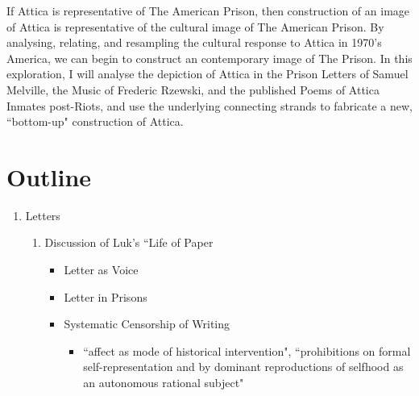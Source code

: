 \documentclass[14pt, letterpaper]{report}
\begin{document}
	If Attica is representative of The American Prison, then construction 
	of an image of Attica is representative of the cultural image of 
	The American Prison. By analysing, relating, and resampling the 
	cultural response to Attica in 1970's America, we can begin to 
	construct an contemporary image of The Prison. In this exploration, 
	I will analyse the depiction of Attica in the Prison Letters of 
	Samuel Melville, the Music of Frederic Rzewski, and the published 
	Poems of Attica Inmates post-Riots, and use the underlying connecting 
	strands to fabricate a new, ``bottom-up" construction of Attica. 
	
	\section*{Outline}
	
	\begin{enumerate}
	
		\item Letters
		\begin{enumerate}
		
			\item Discussion of Luk's ``Life of Paper
			\begin{itemize}
				
				\item Letter as Voice
				
				\item Letter in Prisons
				
				\item Systematic Censorship of Writing
				\begin{itemize}

					\item ``affect as mode of historical intervention", 
					``prohibitions on formal self-representation and by 
					dominant reproductions of selfhood as an autonomous 
					rational subject"
				
				\end{itemize}
				
			\end{itemize}
		
		\end{enumerate}			
	
	\end{enumerate}

\clearpage

\nocite{*}

\printbibliography
\end{document}
